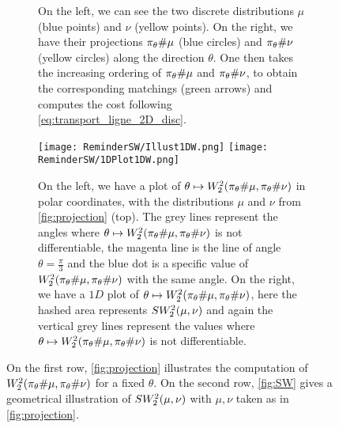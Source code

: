 \begin{figure}[!h]
\begin{subfigure}{\textwidth}
\begin{center}
\caption{On the left, {we can see} the two discrete distributions $\mu$ 
{(blue points)} and $\nu$ {(yellow points)}. On the right, 
{we have} their projections $\pi_{\theta} \# \mu$ {(blue circles)} and $\pi_{\theta} \# \nu$ 
{(yellow circles)}
along the direction $\theta$. One then takes the increasing ordering of $\pi_{\theta} \# \mu$ 
and $\pi_{\theta} \# \nu$, 
{to obtain}
the corresponding matchings {(green arrows)} and computes the cost 
{following}
\autoref{eq:transport_ligne_2D_disc}.}
\label{fig:projection}
\end{center}
\end{subfigure}
\newline
\begin{subfigure}{\textwidth}
\begin{center}
\texttt{[image: ReminderSW/Illust1DW.png]}
\texttt{[image: ReminderSW/1DPlot1DW.png]}
\caption{On the left, we have a plot of $\theta \mapsto W_2^2(\pi_{\theta} \# \mu, \pi_{\theta} \# 
\nu)$ in polar coordinates, 
with 
{the distributions}
$\mu$ and $\nu$ 
{from \autoref{fig:projection} (top).}
The grey lines represent the 
angles where $\theta \mapsto W_2^2(\pi_{\theta} \# \mu, \pi_{\theta} \# \nu)$ is not 
differentiable, the magenta line is the line of angle $\theta = \frac{\pi}{3}$ 
and the blue dot is a specific value of $W_2^2(\pi_{\theta} \# \mu, \pi_{\theta} \# \nu)$ with the 
same angle. On the right, we have a $1D$ plot of $\theta \mapsto W_2^2(\pi_{\theta} \# \mu, 
\pi_{\theta} \# \nu)$, here the hashed area represents $SW_2^2(\mu,\nu)$ and again the 
vertical grey lines represent the values where $\theta \mapsto W_2^2(\pi_{\theta} \# \mu, 
\pi_{\theta} \# \nu)$ is not differentiable. }
\label{fig:SW}
\end{center}
\end{subfigure}
\label{fig:proj&SW}
\caption{On the first row, \autoref{fig:projection} illustrates the 
{computation}
of $W_2^2(\pi_{\theta} \# \mu, \pi_{\theta} \# \nu)$ for a fixed $\theta$. On the second 
row, \autoref{fig:SW} gives a geometrical illustration of $SW_2^2(\mu,\nu)$ with 
$\mu,\nu$ taken as in \autoref{fig:projection}.}
\label{fig:overallSWcomputation}
\end{figure}

